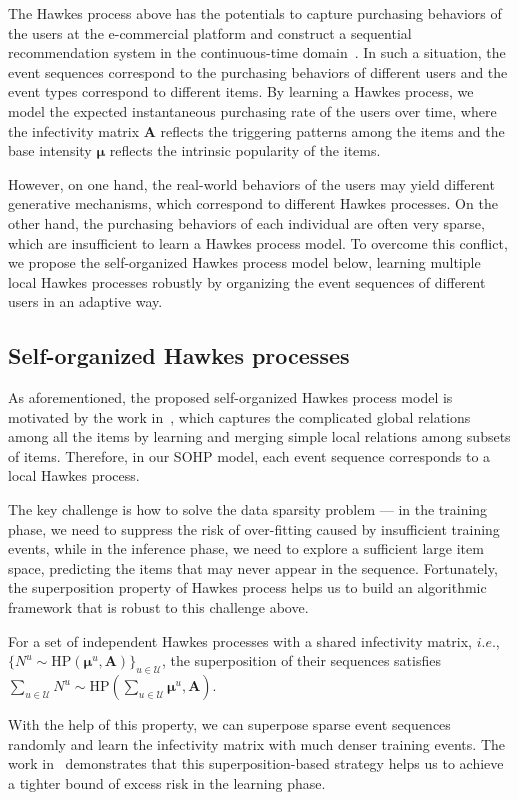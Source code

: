 \documentclass[runningheads]{llncs}
\begin{document}
The Hawkes process above has the potentials to capture purchasing behaviors of the users at the e-commercial platform and construct a sequential recommendation system in the continuous-time domain~\cite{xu2018benefits}.
In such a situation, the event sequences correspond to the purchasing behaviors of different users and the event types correspond to different items. 
By learning a Hawkes process, we model the expected instantaneous purchasing rate of the users over time, where the infectivity matrix $\bm{A}$ reflects the triggering patterns among the items and the base intensity $\bm{\mu}$ reflects the intrinsic popularity of the items.

However, on one hand, the real-world behaviors of the users may yield different generative mechanisms, which correspond to different Hawkes processes. 
On the other hand, the purchasing behaviors of each individual are often very sparse, which are insufficient to learn a Hawkes process model. 
To overcome this conflict, we propose the self-organized Hawkes process model below, learning multiple local Hawkes processes robustly by organizing the event sequences of different users in an adaptive way.


\subsection{Self-organized Hawkes processes}
As aforementioned, the proposed self-organized Hawkes process model is motivated by the work in~\cite{lee2013local,lee2014local}, which captures the complicated global relations among all the items by learning and merging simple local relations among subsets of items.
Therefore, in our SOHP model, each event sequence corresponds to a local Hawkes process. 

The key challenge is how to solve the data sparsity problem --- in the training phase, we need to suppress the risk of over-fitting caused by insufficient training events, while in the inference phase, we need to explore a sufficient large item space, predicting the items that may never appear in the sequence. 
Fortunately, the superposition property of Hawkes process helps us to build an algorithmic framework that is robust to this challenge above.
\begin{theorem}\label{them:superpose}
For a set of independent Hawkes processes with a shared infectivity matrix, $i.e.$, $\{N^u \sim \text{HP}(\bm{\mu}^u,\bm{A})\}_{u\in\mathcal{U}}$, the superposition of their sequences satisfies $\sum_{u\in\mathcal{U}} N^u \sim \text{HP}(\sum_{u\in\mathcal{U}} \bm{\mu}^u,\bm{A})$.  
\end{theorem}
With the help of this property, we can superpose sparse event sequences randomly and learn the infectivity matrix with much denser training events. 
The work in~\cite{xu2018benefits} demonstrates that this superposition-based strategy helps us to achieve a tighter bound of excess risk in the learning phase.
\end{document}

